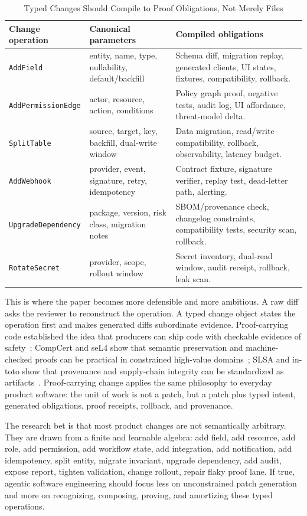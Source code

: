 \begin{table}[t]
\caption{Typed Changes Should Compile to Proof Obligations, Not Merely Files}
\label{tab:typed-change-compiler}
\centering
\footnotesize
\begin{tabularx}{\textwidth}{p{}p{}X}
\toprule
Change operation & Canonical parameters & Compiled obligations \\
\midrule
\texttt{AddField} & entity, name, type, nullability, default/backfill & Schema diff, migration replay, generated clients, UI states, fixtures, compatibility, rollback. \\
\texttt{AddPermissionEdge} & actor, resource, action, conditions & Policy graph proof, negative tests, audit log, UI affordance, threat-model delta. \\
\texttt{SplitTable} & source, target, key, backfill, dual-write window & Data migration, read/write compatibility, rollback, observability, latency budget. \\
\texttt{AddWebhook} & provider, event, signature, retry, idempotency & Contract fixture, signature verifier, replay test, dead-letter path, alerting. \\
\texttt{UpgradeDependency} & package, version, risk class, migration notes & SBOM/provenance check, changelog constraints, compatibility tests, security scan, rollback. \\
\texttt{RotateSecret} & provider, scope, rollout window & Secret inventory, dual-read window, audit receipt, rollback, leak scan. \\
\bottomrule
\end{tabularx}
\end{table}

This is where the paper becomes more defensible and more ambitious. A raw diff asks the reviewer to reconstruct the operation. A typed change object states the operation first and makes generated diffs subordinate evidence. Proof-carrying code established the idea that producers can ship code with checkable evidence of safety~\cite{proofCarryingCode}; CompCert and seL4 show that semantic preservation and machine-checked proofs can be practical in constrained high-value domains~\cite{compcertManual,sel4Proofs}; SLSA and in-toto show that provenance and supply-chain integrity can be standardized as artifacts~\cite{slsa,intoto}. Proof-carrying change applies the same philosophy to everyday product software: the unit of work is not a patch, but a patch plus typed intent, generated obligations, proof receipts, rollback, and provenance.

The research bet is that most product changes are not semantically arbitrary. They are drawn from a finite and learnable algebra: add field, add resource, add role, add permission, add workflow state, add integration, add notification, add idempotency, split entity, migrate invariant, upgrade dependency, add audit, expose report, tighten validation, change rollout, repair flaky proof lane. If true, agentic software engineering should focus less on unconstrained patch generation and more on recognizing, composing, proving, and amortizing these typed operations.

